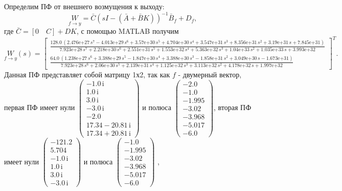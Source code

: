 Определим ПФ от внешнего возмущения к выходу:
\begin{equation*}
    \underset{f\rightarrow y}{W}=\bar C(sI-(\bar A+\bar BK))^{-1}\bar B_f+D_f,
\end{equation*}
где $\bar C=[0\quad C] + DK$, с помощью MATLAB получим
\begin{equation*}
    \underset{f\rightarrow y}{W}(s)=\begin{bmatrix}
\frac{128.0\,{\left(\text{2.476e+27}\,s^7 -\text{4.013e+29}\,s^6 +\text{3.57e+30}\,s^5 +\text{4.704e+30}\,s^4 +\text{3.547e+31}\,s^3 +\text{8.356e+31}\,s^2 +\text{3.19e+31}\,s+\text{7.845e+31}\right)}}{\text{7.923e+28}\,s^7 +\text{2.218e+30}\,s^6 +\text{2.551e+31}\,s^5 +\text{1.553e+32}\,s^4 +\text{5.363e+32}\,s^3 +\text{1.04e+33}\,s^2 +\text{1.035e+33}\,s+\text{3.993e+32}} \\ \frac{64.0\,{\left(\text{1.238e+27}\,s^6 +\text{3.388e+29}\,s^5 -\text{1.847e+30}\,s^4 +\text{3.388e+30}\,s^3 -\text{1.858e+31}\,s^2 +\text{3.049e+30}\,s-\text{1.673e+31}\right)}}{\text{7.923e+28}\,s^6 +\text{2.06e+30}\,s^5 +\text{2.139e+31}\,s^4 +\text{1.125e+32}\,s^3 +\text{3.113e+32}\,s^2 +\text{4.178e+32}\,s+\text{1.997e+32}}
\end{bmatrix}^T.
\end{equation*}
Данная ПФ представляет собой матрицу 1х2, так как $f$ - двумерный вектор, 
первая ПФ имеет нули $\left(\begin{array}{c}
-1.0\,\mathrm{i}\\
1.0\,\mathrm{i}\\
3.0\,\mathrm{i}\\
-3.0\,\mathrm{i}\\
-2.0\\
17.34-20.81\,\mathrm{i}\\
17.34+20.81\,\mathrm{i}
\end{array}\right)$ и полюса $\left(\begin{array}{c}
-2.0\\
-1.0\\
-1.995\\
-3.02\\
-3.968\\
-5.017\\
-6.0
\end{array}\right)$,
вторая ПФ имеет нули $\left(\begin{array}{c}
-121.2\\
5.704\\
-1.0\,\mathrm{i}\\
1.0\,\mathrm{i}\\
3.0\,\mathrm{i}\\
-3.0\,\mathrm{i}
\end{array}\right)$ и полюса $\left(\begin{array}{c}
-1.0\\
-1.995\\
-3.02\\
-3.968\\
-5.017\\
-6.0
\end{array}\right)$ ,
